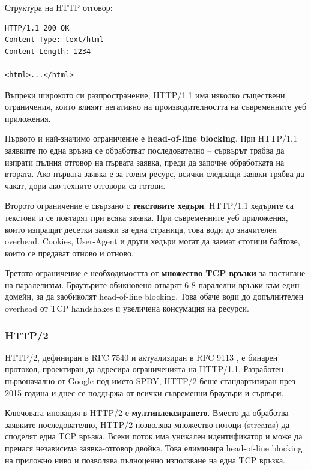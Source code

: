 Структура на HTTP отговор:
\begin{verbatim}
HTTP/1.1 200 OK
Content-Type: text/html
Content-Length: 1234

<html>...</html>
\end{verbatim}

Въпреки широкото си разпространение, HTTP/1.1 има няколко съществени ограничения, които влияят негативно на производителността на съвременните уеб приложения.

Първото и най-значимо ограничение е \textbf{head-of-line blocking}. При HTTP/1.1 заявките по една връзка се обработват последователно -- сървърът трябва да изпрати пълния отговор на първата заявка, преди да започне обработката на втората. Ако първата заявка е за голям ресурс, всички следващи заявки трябва да чакат, дори ако техните отговори са готови.

Второто ограничение е свързано с \textbf{текстовите хедъри}. HTTP/1.1 хедърите са текстови и се повтарят при всяка заявка. При съвременните уеб приложения, които изпращат десетки заявки за една страница, това води до значителен overhead. Cookies, User-Agent и други хедъри могат да заемат стотици байтове, които се предават отново и отново.

Третото ограничение е необходимостта от \textbf{множество TCP връзки} за постигане на паралелизъм. Браузърите обикновено отварят 6-8 паралелни връзки към един домейн, за да заобиколят head-of-line blocking. Това обаче води до допълнителен overhead от TCP handshakes и увеличена консумация на ресурси.

\subsubsection{HTTP/2}

HTTP/2, дефиниран в RFC 7540 \cite{rfc7540} и актуализиран в RFC 9113 \cite{rfc9113}, е бинарен протокол, проектиран да адресира ограниченията на HTTP/1.1. Разработен първоначално от Google под името SPDY, HTTP/2 беше стандартизиран през 2015 година и днес се поддържа от всички съвременни браузъри и сървъри.

Ключовата иновация в HTTP/2 е \textbf{мултиплексирането}. Вместо да обработва заявките последователно, HTTP/2 позволява множество потоци (streams) да споделят една TCP връзка. Всеки поток има уникален идентификатор и може да пренася независима заявка-отговор двойка. Това елиминира head-of-line blocking на приложно ниво и позволява пълноценно използване на една TCP връзка.

